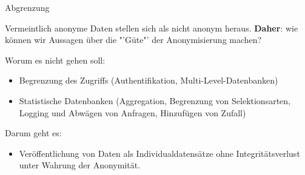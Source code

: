 \begin{frame}{Abgrenzung}

Vermeintlich anonyme Daten stellen sich als nicht anonym heraus. \textbf{Daher}: wie können wir Aussagen über die "'Güte"' der Anonymisierung machen?

\vspace{0.5cm}
\pause

Worum es nicht gehen soll:

\begin{itemize}
	\item Begrenzung des Zugriffs (Authentifikation, Multi-Level-Datenbanken)
	\item Statistische Datenbanken (Aggregation, Begrenzung von Selektionsarten, Logging und Abwägen von Anfragen, Hinzufügen von Zufall)
\end{itemize}

Darum geht es:

\begin{itemize}
	\item Veröffentlichung von Daten als Individualdatensätze ohne Integritätsverlust unter Wahrung der Anonymität.
\end{itemize}

\end{frame}
